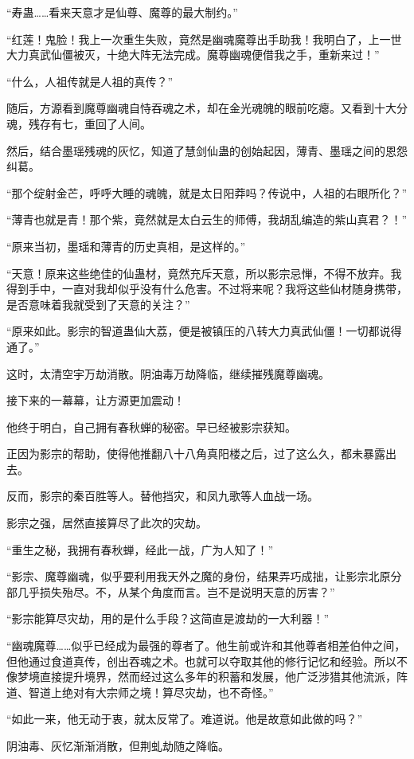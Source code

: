 \begin{this_body}
“寿蛊……看来天意才是仙尊、魔尊的最大制约。”

“红莲！鬼脸！我上一次重生失败，竟然是幽魂魔尊出手助我！我明白了，上一世大力真武仙僵被灭，十绝大阵无法完成。魔尊幽魂便借我之手，重新来过！”

“什么，人祖传就是人祖的真传？”

随后，方源看到魔尊幽魂自恃吞魂之术，却在金光魂魄的眼前吃瘪。又看到十大分魂，残存有七，重回了人间。

然后，结合墨瑶残魂的灰忆，知道了慧剑仙蛊的创始起因，薄青、墨瑶之间的恩怨纠葛。

“那个绽射金芒，呼呼大睡的魂魄，就是太日阳莽吗？传说中，人祖的右眼所化？”

“薄青也就是青！那个紫，竟然就是太白云生的师傅，我胡乱编造的紫山真君？！”

“原来当初，墨瑶和薄青的历史真相，是这样的。”

“天意！原来这些绝佳的仙蛊材，竟然充斥天意，所以影宗忌惮，不得不放弃。我得到手中，一直对我却似乎没有什么危害。不过将来呢？我将这些仙材随身携带，是否意味着我就受到了天意的关注？”

“原来如此。影宗的智道蛊仙大荔，便是被镇压的八转大力真武仙僵！一切都说得通了。”

这时，太清空宇万劫消散。阴油毒万劫降临，继续摧残魔尊幽魂。

接下来的一幕幕，让方源更加震动！

他终于明白，自己拥有春秋蝉的秘密。早已经被影宗获知。

正因为影宗的帮助，使得他推翻八十八角真阳楼之后，过了这么久，都未暴露出去。

反而，影宗的秦百胜等人。替他挡灾，和凤九歌等人血战一场。

影宗之强，居然直接算尽了此次的灾劫。

“重生之秘，我拥有春秋蝉，经此一战，广为人知了！”

“影宗、魔尊幽魂，似乎要利用我天外之魔的身份，结果弄巧成拙，让影宗北原分部几乎损失殆尽。不，从某个角度而言。岂不是说明天意的厉害？”

“影宗能算尽灾劫，用的是什么手段？这简直是渡劫的一大利器！”

“幽魂魔尊……似乎已经成为最强的尊者了。他生前或许和其他尊者相差伯仲之间，但他通过食道真传，创出吞魂之术。也就可以夺取其他的修行记忆和经验。所以不像梦境直接提升境界，然而经过这么多年的积蓄和发展，他广泛涉猎其他流派，阵道、智道上绝对有大宗师之境！算尽灾劫，也不奇怪。”

“如此一来，他无动于衷，就太反常了。难道说。他是故意如此做的吗？”

阴油毒、灰忆渐渐消散，但荆虬劫随之降临。


\end{this_body}
